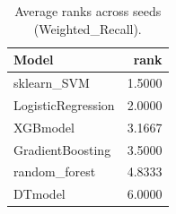 \begin{table}[t]
\centering
\begin{tabular}{lr}
\toprule
Model & rank \\
\midrule
sklearn_SVM & 1.5000 \\
LogisticRegression & 2.0000 \\
XGBmodel & 3.1667 \\
GradientBoosting & 3.5000 \\
random_forest & 4.8333 \\
DTmodel & 6.0000 \\
\bottomrule
\end{tabular}
\caption{Average ranks across seeds (Weighted_Recall).}
\label{tab:avg_rank_Weighted_Recall}
\end{table}